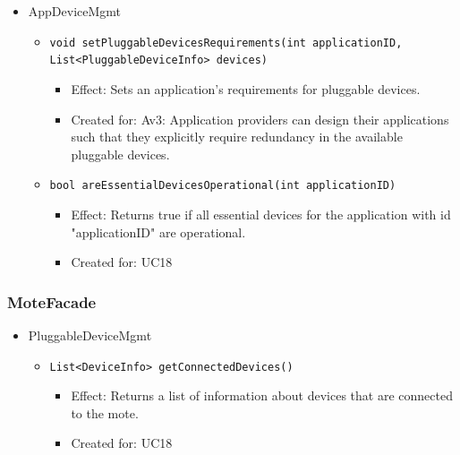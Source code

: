 \begin{itemize}
            \item AppDeviceMgmt
            \begin{itemize}
                \item \texttt{void setPluggableDevicesRequirements(int applicationID, List<PluggableDeviceInfo> devices)}
                \begin{itemize}
                    \item Effect: Sets an application's requirements for pluggable devices.
                    \item Created for: Av3: Application providers can design their applications
                          such that they explicitly require redundancy in
                          the available pluggable devices.
                \end{itemize}
                \item \texttt{bool areEssentialDevicesOperational(int applicationID)}
                \begin{itemize}
                    \item Effect: Returns true if all essential devices for the application
                                  with id "applicationID" are operational.
                    \item Created for: UC18
                \end{itemize}
            \end{itemize}
        \end{itemize}

    \subsubsection{MoteFacade}
        \begin{itemize}
            \item PluggableDeviceMgmt
            \begin{itemize}
                \item \texttt{List<DeviceInfo> getConnectedDevices()}
                \begin{itemize}
                    \item Effect: Returns a list of information about devices that are connected to the mote.
                    \item Created for: UC18
                \end{itemize}
            \end{itemize}
        \end{itemize}

